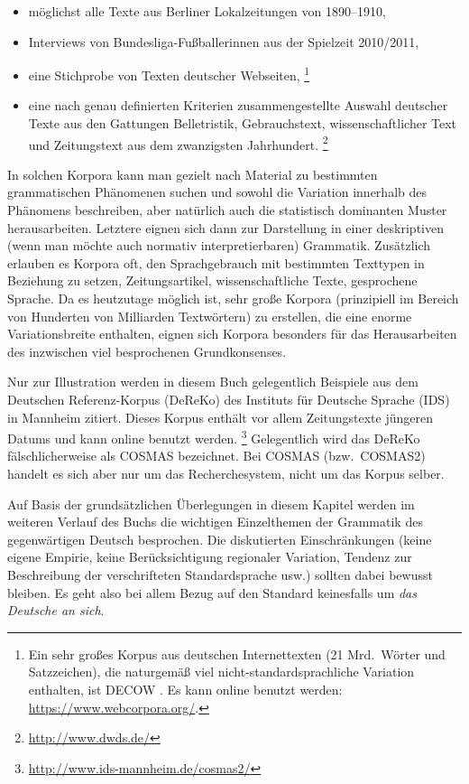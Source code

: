 \begin{itemize}
  \item möglichst alle Texte aus Berliner Lokalzeitungen von 1890--1910,
  \item Interviews von Bundesliga-Fußballerinnen aus der Spielzeit 2010\slash 2011,
  \item eine Stichprobe von Texten deutscher Webseiten,%
    \footnote{Ein sehr großes Korpus aus deutschen Internettexten (21 Mrd.\ Wörter und Satzzeichen), die naturgemäß viel nicht-standardsprachliche Variation enthalten, ist DECOW \citep{SchaeferBildhauer2012a}.
    Es kann online benutzt werden: \url{https://www.webcorpora.org/}.}
  \item eine nach genau definierten Kriterien zusammengestellte Auswahl deutscher Texte aus den Gattungen Belletristik, Gebrauchstext, wissenschaftlicher Text und Zeitungstext aus dem zwanzigsten Jahrhundert.%
    \footnote{\url{http://www.dwds.de/}}
\end{itemize}

In solchen Korpora kann man gezielt nach Material zu bestimmten grammatischen Phänomenen suchen und sowohl die Variation innerhalb des Phänomens beschreiben, aber natürlich auch die statistisch dominanten Muster herausarbeiten.
Letztere eignen sich dann zur Darstellung in einer deskriptiven (wenn man möchte auch normativ interpretierbaren) Grammatik.
Zusätzlich erlauben es Korpora oft, den Sprachgebrauch mit bestimmten Texttypen in Beziehung zu setzen, \zB Zeitungsartikel, wissenschaftliche Texte, gesprochene Sprache.
Da es heutzutage möglich ist, sehr große Korpora (prinzipiell im Bereich von Hunderten von Milliarden Textwörtern) zu erstellen, die eine enorme Variationsbreite enthalten, eignen sich Korpora besonders für das Herausarbeiten des inzwischen viel besprochenen Grundkonsenses.

Nur zur Illustration werden in diesem Buch gelegentlich Beispiele aus dem Deutschen Referenz-Korpus (DeReKo) des Instituts für Deutsche Sprache (IDS) in Mannheim zitiert.\label{abs:empirie047}
Dieses Korpus enthält vor allem Zeitungstexte jüngeren Datums und kann online benutzt werden.%
\footnote{\url{http://www.ids-mannheim.de/cosmas2/}}
Gelegentlich wird das DeReKo fälschlicherweise als COSMAS bezeichnet.
Bei COSMAS (bzw.\ COSMAS2) handelt es sich aber nur um das Recherchesystem, nicht um das Korpus selber.

Auf Basis der grundsätzlichen Überlegungen in diesem Kapitel werden im weiteren Verlauf des Buchs die wichtigen Einzelthemen der Grammatik des gegenwärtigen Deutsch besprochen.
Die diskutierten Einschränkungen (keine eigene Empirie, keine Berücksichtigung regionaler Variation, Tendenz zur Beschreibung der verschrifteten Standardsprache usw.) sollten dabei bewusst bleiben.
Es geht also bei allem Bezug auf den Standard keinesfalls um \textit{das Deutsche an sich}.

